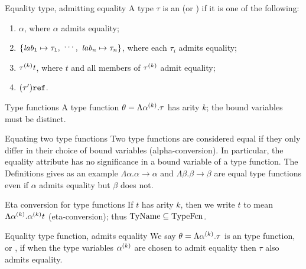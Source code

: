 \begin{definition}{Equality type, admitting equality}
A type $\tau$ is an  (or )
if it is one of the following:
\begin{enumerate}
\item $\alpha$, where $\alpha$ admits equality;
\item $\{\lab_{1}\mapsto\tau_{1},\ \syndots,\ \lab_{n}\mapsto\tau_{n}\}$,
      where each $\tau_{i}$ admits equality;
\item $\mbox{$\tau^{(k)}$}t$, where $t$ and all members of $\mbox{$\tau^{(k)}$}$ admit equality;
\item $(\tau')\mbox{\tt ref}$.
\end{enumerate}
\end{definition}

\begin{clause}{Type functions}
A type function $\theta=\Lambda\mbox{$\alpha^{(k)}$}.\tau$ has arity $k$; the bound
variables must be distinct.
\end{clause}

\begin{clause}{Equating two type functions}\label{convention:static-core:equating-type-functions}
Two type functions are considered equal if they only differ in their
choice of bound variables (alpha-conversion). In particular, the
equality attribute has no significance in a bound variable of a type function.
The Definitions gives as an example $\Lambda\alpha.\alpha\to
\alpha$ and $\Lambda\beta.\beta\to\beta$ are equal type functions
even if $\alpha$ admits equality but $\beta$ does not.
\end{clause}

\begin{clause}{Eta conversion for type functions}
If $t$ has arity $k$, then we write $t$ to mean $\Lambda\mbox{$\alpha^{(k)}$}.\mbox{$\alpha^{(k)}$}t$
(eta-conversion); thus ${\rm TyName}\subseteq{\rm TypeFcn}$.
\end{clause}

\begin{definition}{Equality type function, admits equality}
We say $\theta=\Lambda\mbox{$\alpha^{(k)}$}.\tau$
is an  type function, or , if when the
type variables $\mbox{$\alpha^{(k)}$}$ are chosen to admit equality then $\tau$ also admits
equality.
\end{definition}

